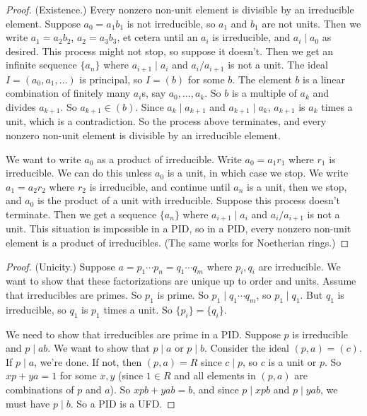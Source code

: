 \documentclass[11pt, oneside,margin=1in]{article}
\begin{document}
\begin{proof} (Existence.)
Every nonzero non-unit element is divisible by an irreducible element. Suppose $a_0=a_1b_1$ is not irreducible, so $a_1$ and $b_1$ are not units. Then we write $a_1 = a_2b_2$, $a_2 = a_3b_3$, et cetera until an $a_i$ is irreducible, and $a_i\mid a_0$ as desired. This process might not stop, so suppose it doesn't. Then we get an infinite sequence $\{a_n\}$ where $a_{i+1} \mid a_i$ and $a_i / a_{i+1}$ is not a unit. The ideal $I = (a_0,a_1,\hdots)$ is principal, so $I = (b)$ for some $b$. The element $b$ is a linear combination of finitely many $a_i$s, say $a_0,\hdots,a_k$. So $b$ is a multiple of $a_k$ and divides $a_{k+1}$. So $a_{k+1}\in (b)$. Since $a_k\mid a_{k+1}$ and $a_{k+1}\mid a_k$, $a_{k+1}$ is $a_k$ times a unit, which is a contradiction. So the process above terminates, and every nonzero non-unit element is divisible by an irreducible element. 

We want to write $a_0$ as a product of irreducible. Write $a_0 = a_1r_1$ where $r_1$ is irreducible. We can do this unless $a_0$ is a unit, in which case we stop. We write $a_1 = a_2r_2$ where $r_2$ is irreducible, and continue until $a_n$ is a unit, then we stop, and $a_0$ is the product of a unit with irreducible. Suppose this process doesn't terminate. Then we get a sequence $\{a_n\}$ where $a_{i+1} \mid a_i$ and $a_i/a_{i+1}$ is not a unit. This situation is impossible in a PID, so in a PID, every nonzero non-unit element is a product of irreducibles. (The same works for {Noetherian rings}.)
\end{proof}

\begin{proof} (Unicity.) 
Suppose $a = p_1\cdots p_n = q_1 \cdots q_m$ where $p_i,q_i$ are irreducible. We want to show that these factorizations are unique up to order and units. Assume that irreducibles are primes. So $p_1$ is prime. So $p_1 \mid q_1\cdots q_m$, so $p_1 \mid q_1$. But $q_1$ is irreducible, so $q_1$ is $p_1$ times a unit. So $\{p_i\} = \{q_i\}$.

We need to show that irreducibles are prime in a PID. Suppose $p$ is irreducible and $p\mid ab$. We want to show that $p\mid a$ or $p\mid b$. Consider the ideal $(p,a)= (c)$. If $p\mid a$, we're done. If not, then $(p,a) = R$ since $c\mid p$, so $c$ is a unit or $p$. So $xp + ya=1$ for some $x,y$ (since $1\in R$ and all elements in $(p,a)$ are combinations of $p$ and $a$). So $xpb + yab = b$, and since $p\mid xpb$ and $p\mid yab$, we must have $p\mid b$. So a PID is a UFD.
\end{proof}
\end{document}
